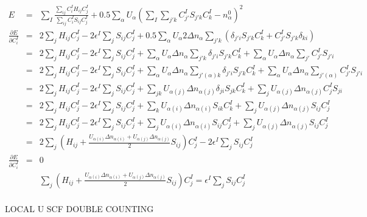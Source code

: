 \documentclass{article}
\begin{document}
\begin{eqnarray*}
E & = & \sum_I \frac{ \sum_{ij}{ C^I_i H_{ij} C^I_j}}{\sum_{ij} { C^I_i S_{ij} C^I_j} }  +
  0.5 \sum_\alpha U_\alpha \left( \sum_I { \sum_{j'k} C^I_{j'} S_{j'k} C^I_{k} - n_\alpha^0 } \right)^2 \\
\frac{\partial E}{\partial C^I_i} & = & 
  2 \sum_j H_{ij} C^I_j - 2 \epsilon^I \sum_j S_{ij} C^I_j +
  0.5 \sum_\alpha U_\alpha 2 \Delta n_\alpha 
  \sum_{j'k} \left( \delta_{j'i} S_{j'k} C^I_k + C^I_{j'} S_{j'k} \delta_{ki} \right) \\
 & = &  
  2 \sum_j H_{ij} C^I_j - 2 \epsilon^I \sum_j S_{ij} C^I_j +
  \sum_\alpha U_\alpha \Delta n_\alpha \sum_{j'k} \delta_{j'i} S_{j'k} C^I_k +
  \sum_\alpha U_\alpha \Delta n_\alpha \sum_{j'} C^I_{j'} S_{j'i} \\
 & = &  
  2 \sum_j H_{ij} C^I_j - 2 \epsilon^I \sum_j S_{ij} C^I_j +
  \sum_\alpha U_\alpha \Delta n_\alpha \sum_{j'(\alpha)k} \delta_{j'i} S_{j'k} C^I_k +
  \sum_\alpha U_\alpha \Delta n_\alpha \sum_{j'(\alpha)} C^I_{j'} S_{j'i} \\
 & = &  
  2 \sum_j H_{ij} C^I_j - 2 \epsilon^I \sum_j S_{ij} C^I_j +
  \sum_{jk} U_{\alpha(j)} \Delta n_{\alpha(j)} \delta_{ji} S_{jk} C^I_k +
  \sum_j U_{\alpha(j)} \Delta n_{\alpha(j)} C^I_{j} S_{ji} \\
 & = &  
  2 \sum_j H_{ij} C^I_j - 2 \epsilon^I \sum_j S_{ij} C^I_j +
  \sum_k U_{\alpha(i)} \Delta n_{\alpha(i)} S_{ik} C^I_k +
  \sum_j U_{\alpha(j)} \Delta n_{\alpha(j)} S_{ij} C^I_{j}  \\
 & = &  
  2 \sum_j H_{ij} C^I_j - 2 \epsilon^I \sum_j S_{ij} C^I_j +
  \sum_j U_{\alpha(i)} \Delta n_{\alpha(i)} S_{ij} C^I_j +
  \sum_j U_{\alpha(j)} \Delta n_{\alpha(j)} S_{ij} C^I_{j}  \\
 & = &  
  2 \sum_j \left(H_{ij} + \frac{U_{\alpha(i)} \Delta n_{\alpha(i)}  + U_{\alpha(j)} \Delta n_{\alpha(j)} }{2} S_{ij} \right) C^I_j - 
  2 \epsilon^I \sum_j S_{ij} C^I_j \\
\frac{\partial E}{\partial C^I_i} & = & 0 \\
  & & \sum_j \left(H_{ij} + \frac{U_{\alpha(i)} \Delta n_{\alpha(i)}  + U_{\alpha(j)} \Delta n_{\alpha(j)} }{2} S_{ij} \right) C^I_j = 
  \epsilon^I \sum_j S_{ij} C^I_j \\
\end{eqnarray*}

LOCAL U SCF DOUBLE COUNTING
\end{document}
